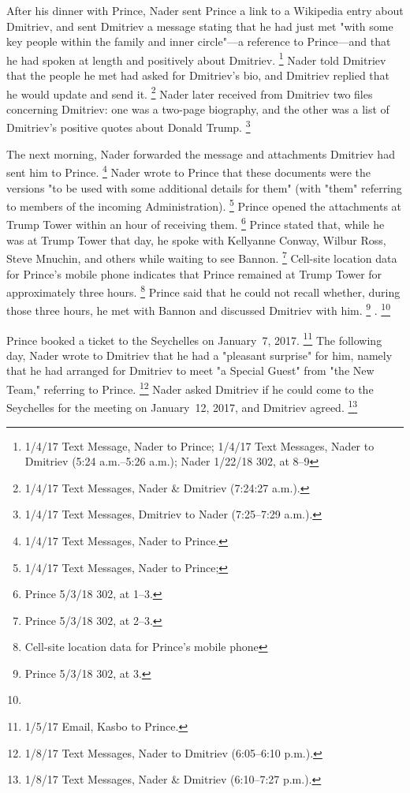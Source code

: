After his dinner with Prince, Nader sent Prince a link to a Wikipedia entry about Dmitriev, and sent Dmitriev a message stating that he had just met "with some key people within the family and inner circle"---a reference to Prince---and that he had spoken at length and positively about Dmitriev.%
\footnote{1/4/17 Text Message, Nader to Prince;
1/4/17 Text Messages, Nader to Dmitriev (5:24 a.m.--5:26 a.m.);
Nader 1/22/18 302, at 8--9
}
Nader told Dmitriev that the people he met had asked for Dmitriev's bio, and Dmitriev replied that he would update and send it.%
\footnote{1/4/17 Text Messages, Nader \& Dmitriev (7:24:27 a.m.).}
Nader later received from Dmitriev two files concerning Dmitriev: one was a two-page biography, and the other was a list of Dmitriev's positive quotes about Donald Trump.%
\footnote{1/4/17 Text Messages, Dmitriev to Nader (7:25--7:29 a.m.).}

The next morning, Nader forwarded the message and attachments Dmitriev had sent him to Prince.%
\footnote{1/4/17 Text Messages, Nader to Prince.}
Nader wrote to Prince that these documents were the versions "to be used with some additional details for them" (with "them" referring to members of the incoming Administration).%
\footnote{1/4/17 Text Messages, Nader to Prince; }
Prince opened the attachments at Trump Tower within an hour of receiving them.%
\footnote{Prince 5/3/18 302, at 1--3.}
Prince stated that, while he was at Trump Tower that day, he spoke with Kellyanne Conway, Wilbur Ross, Steve Mnuchin, and others while waiting to see Bannon.%
\footnote{Prince 5/3/18 302, at 2--3.}
Cell-site location data for Prince's mobile phone indicates that Prince remained at Trump Tower for approximately three hours.%
\footnote{Cell-site location data for Prince's mobile phone }
Prince said that he could not recall whether, during those three hours, he met with Bannon and discussed Dmitriev with him.%
\footnote{Prince 5/3/18 302, at 3.}
.%
\footnote{}

Prince booked a ticket to the Seychelles on January~7, 2017.%
\footnote{1/5/17 Email, Kasbo to Prince.}
The following day, Nader wrote to Dmitriev that he had a "pleasant surprise" for him, namely that he had arranged for Dmitriev to meet "a Special Guest" from "the New Team," referring to Prince.%
\footnote{1/8/17 Text Messages, Nader to Dmitriev (6:05--6:10 p.m.).}
Nader asked Dmitriev if he could come to the Seychelles for the meeting on January~12, 2017, and Dmitriev agreed.%
\footnote{1/8/17 Text Messages, Nader \& Dmitriev (6:10--7:27 p.m.).}

